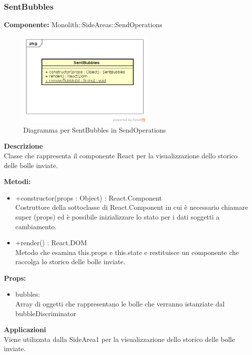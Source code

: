 \subsubsection{SentBubbles}
\textbf{Componente:}  Monolith::SideAreas::SendOperations\\
   \FloatBarrier
   \begin{figure}[ht]
   \centering
   \includegraphics[width=0.6\textwidth]{img/single-SentBubble.png}
   \caption{{Diagramma per SentBubbles in SendOperations}}
\end{figure}
\FloatBarrier
\textbf{Descrizione}\\
Classe che rappresenta il componente React per la visualizzazione dello storico delle bolle inviate.

\textbf{Metodi:} 
\begin{itemize}

\item +constructor(props : Object) : React.Component 
\\
Costruttore della sottoclasse di React.Component in cui è necessario chiamare super (props) ed è possibile inizializzare lo stato per i dati soggetti a cambiamento.

\item +render() : React.DOM 
\\
Metodo che esamina this.props e this.state e restituisce un componente che raccolga lo storico delle bolle inviate.

\end{itemize}


\textbf{Props:} 
\begin{itemize}
\item bubbles: 
\\
Array di oggetti che rappresentano le bolle che verranno istanziate dal bubbleDiscriminator


\end{itemize} 


\textbf{Applicazioni}\\
Viene utilizzata dalla SideArea1 per la visualizzazione dello storico delle bolle inviate. 



